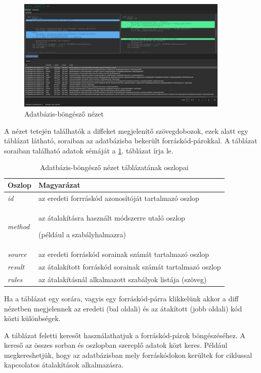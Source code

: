 \begin{figure}[H]
	\centering
	\includegraphics[width=0.9\textwidth]{images/screenshots/database_tab.png}
	\caption{Adatbázis-böngésző nézet}
\end{figure}

A nézet tetején találhatók a diffeket megjelenítő szövegdobozok, ezek alatt
egy táblázat látható, soraiban az adatbázisba bekerült forráskód-párokkal.
A táblázat soraiban található adatok sémáját a \ref{tab:schema}. táblázat írja le.

\begin{table}[H]
	\centering
	\begin{tabular}{ | m{} | m{} | }
		\hline
		\textbf{Oszlop} & \textbf{Magyarázat} \\
		\hline \hline

		\emph{id}
		& az eredeti forrráskód azonosítóját tartalmazó oszlop \\
		\hline
		
		\emph{method}
		& az átalakításra használt módszerre utaló oszlop
		
		(például a szabályhalmazra) \\
		\hline
		
		\emph{source}
		& az eredeti forráskód sorainak számát tartalmazó oszlop \\
		\hline
		
		\emph{result}
		& az átalakított forráskód sorainak számát tartalmazó oszlop \\
		\hline
		
		\emph{rules}
		& az átalakításnál alkalmazott szabályok listája (szöveg) \\
		\hline
	\end{tabular}
	\caption{Adatbázis-böngésző nézet táblázatának oszlopai}
	\label{tab:schema}
\end{table}

Ha a táblázat egy sorára, vagyis egy forráskód-párra klikkelünk
akkor a diff nézetben megjelennek az eredeti (bal oldali) és az átakított (jobb oldali)
kód közti különbségek.

A táblázat feletti keresőt használathatjuk a forráskód-párok böngészéséhez.
A kereső az összes sorban és oszlopban szereplő adatok közt keres.
Például megkereshetjük, hogy az adatbázisban mely forráskódokon kerültek
for ciklussal kapcsolatos átalakítások alkalmazásra.
